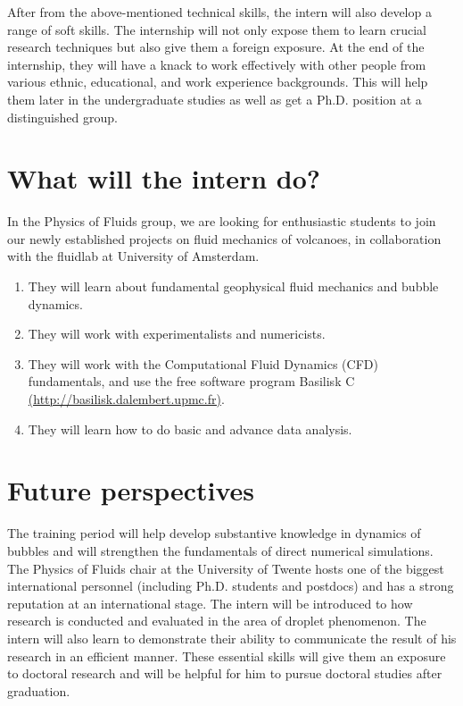 \documentclass[a4paper,10pt]{article}
\begin{document}

\noindent After from the above-mentioned technical skills, the intern will also develop a range of soft skills. The internship will not only expose them to learn crucial research techniques but also give them a foreign exposure. At the end of the internship, they will have a knack to work effectively with other people from various ethnic, educational, and work experience backgrounds. This will help them later in the undergraduate studies as well as get a Ph.D. position at a distinguished group.

\section*{What will the intern do?}
In the Physics of Fluids group, we are looking for enthusiastic students to join our newly established projects on fluid mechanics of volcanoes, in collaboration with the fluidlab at University of Amsterdam.

\begin{enumerate}
\itemsep0em
\item They will learn about fundamental geophysical fluid mechanics and bubble dynamics.
\item They will work with experimentalists and numericists. 
\item They will work with the Computational Fluid Dynamics (CFD) fundamentals, and use the free software program Basilisk C \href{http://basilisk.dalembert.upmc.fr}{(http://basilisk.dalembert.upmc.fr)}.
\item They will learn how to do basic and advance data analysis. 
\end{enumerate}

\section*{Future perspectives}

The training period will help develop substantive knowledge in dynamics of bubbles and will strengthen the fundamentals of direct numerical simulations. The Physics of Fluids chair at the University of Twente hosts one of the biggest international personnel (including Ph.D. students and postdocs) and has a strong reputation at an international stage. The intern will be introduced to how research is conducted and evaluated in the area of droplet phenomenon. The intern will also learn to demonstrate their ability to communicate the result of his research in an efficient manner. These essential skills will give them an exposure to doctoral research and will be helpful for him to pursue doctoral studies after graduation.
\end{document}
